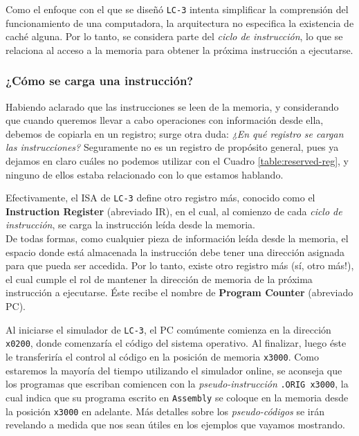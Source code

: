 \documentclass[a4paper, titlepage]{report}
\begin{document}
	Como el enfoque con el que se diseñó \texttt{LC-3} intenta simplificar la comprensión del funcionamiento de una computadora, la arquitectura no especifica la existencia de caché alguna. Por lo tanto, se considera parte del \textit{ciclo de instrucción}, lo que se relaciona al acceso a la memoria para obtener la próxima instrucción a ejecutarse.
	
	\subsubsection{¿Cómo se carga una instrucción?} %
	
	Habiendo aclarado que las instrucciones se leen de la memoria, y considerando que cuando queremos llevar a cabo operaciones con información desde ella, debemos de copiarla en un registro; surge otra duda: \textit{¿En qué registro se cargan las instrucciones?} Seguramente no es un registro de propósito general, pues ya dejamos en claro cuáles no podemos utilizar con el Cuadro \ref{table:reserved-reg}, y ninguno de ellos estaba relacionado con lo que estamos hablando.
	
	Efectivamente, el ISA de \texttt{LC-3} define otro registro más, conocido como el \textbf{Instruction Register} (abreviado IR), en el cual, al comienzo de cada \textit{ciclo de instrucción}, se carga la instrucción leída desde la memoria.\\
	
	De todas formas, como cualquier pieza de información leída desde la memoria, el espacio donde está almacenada la instrucción debe tener una dirección asignada para que pueda ser accedida. Por lo tanto, existe otro registro más (sí, otro más!), el cual cumple el rol de mantener la dirección de memoria de la próxima instrucción a ejecutarse. Éste recibe el nombre de \textbf{Program Counter} (abreviado PC).
	
	Al iniciarse el simulador de \texttt{LC-3}, el PC comúmente comienza en la dirección \texttt{x0200}, donde comenzaría el código del sistema operativo. Al finalizar, luego éste le transferiría el control al código en la posición de memoria \texttt{x3000}. Como estaremos la mayoría del tiempo utilizando el simulador online, se aconseja que los programas que escriban comiencen con la \textit{pseudo-instrucción} \texttt{.ORIG x3000}, la cual indica que su programa escrito en \texttt{Assembly} se coloque en la memoria desde la posición \texttt{x3000} en adelante. Más detalles sobre los \textit{pseudo-códigos} se irán revelando a medida que nos sean útiles en los ejemplos que vayamos mostrando. \\
	
\end{document}
